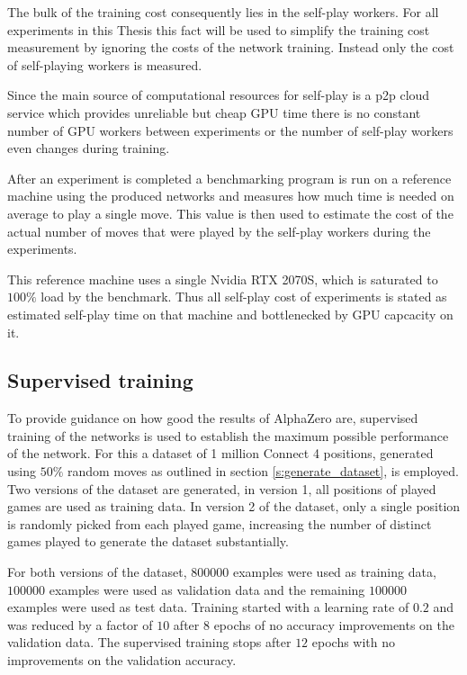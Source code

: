 \documentclass[12pt,onecolumn,oneside,titlepage]{article}
\begin{document}
The bulk of the training cost consequently lies in the self-play workers. For all experiments in this Thesis this fact will be used to simplify the training cost measurement by ignoring the costs of the network training. Instead only the cost of self-playing workers is measured.

Since the main source of computational resources for self-play is a p2p cloud service which provides unreliable but cheap GPU time there is no constant number of GPU workers between experiments or the number of self-play workers even changes during training.

After an experiment is completed a benchmarking program is run on a reference machine using the produced networks and measures how much time is needed on average 
to play a single move. This value is then used to estimate the cost of the actual number of moves that were played by the self-play workers during the experiments.

This reference machine uses a single Nvidia RTX 2070S, which is saturated to $100\%$ load by the benchmark. Thus all self-play cost of experiments is stated as estimated self-play time on that machine and bottlenecked by GPU capcacity on it.

\subsection{Supervised training}\label{sec:supervised}

To provide guidance on how good the results of AlphaZero are, supervised training of the networks is used to establish the maximum possible performance of the network.
For this a dataset of 1 million Connect 4 positions, generated using $50\%$ random moves as outlined in section \ref{s:generate_dataset}, is employed. Two versions of the dataset are generated, in version 1, all positions of played games are used as training data.
In version 2 of the dataset, only a single position is randomly picked from each played game, increasing the number of distinct games played to generate the dataset substantially.

For both versions of the dataset, $800000$ examples were used as training data, $100000$ examples were used as validation data and the remaining $100000$ examples were used as test data.
Training started with a learning rate of $0.2$ and was reduced by a factor of $10$ after $8$ epochs of no accuracy improvements on the validation data. The supervised training stops after $12$ epochs with no improvements on the validation accuracy.
\end{document}
